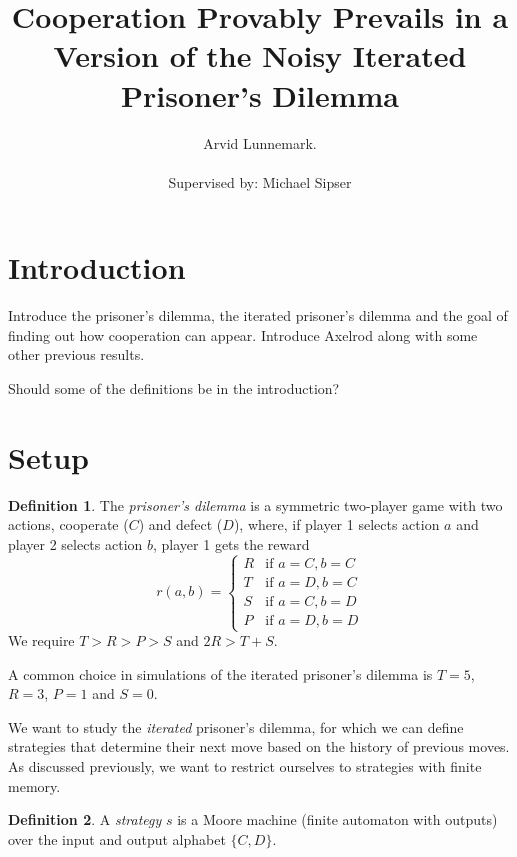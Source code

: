 \documentclass[11pt]{amsart}
\title{Cooperation Provably Prevails in a Version of the Noisy Iterated Prisoner's Dilemma}
\author{Arvid Lunnemark. \\ \\
Supervised by: Michael Sipser}
\theoremstyle{definition}
\newtheorem{definition}{Definition}
\theoremstyle{remark}
\begin{document}
\maketitle

\section{Introduction}

Introduce the prisoner's dilemma, the iterated prisoner's dilemma and the goal of finding out how cooperation can appear. Introduce Axelrod along with some other previous results.

Should some of the definitions be in the introduction?

\section{Setup}

\begin{definition}
  The \textit{prisoner's dilemma} is a symmetric two-player game with two actions, cooperate ($C$) and defect ($D$), where, if player 1 selects action $a$ and player 2 selects action $b$, player 1 gets the reward
  \begin{equation*}
    r(a,b) = \begin{cases}
      R &\text{if $a = C, b = C$} \\
      T &\text{if $a = D, b = C$} \\
      S &\text{if $a = C, b = D$} \\
      P &\text{if $a = D, b = D$}
    \end{cases}
  \end{equation*}
  We require $T > R > P > S$ and $2R > T + S$. 
\end{definition}

A common choice in simulations of the iterated prisoner's dilemma is $T = 5$, $R = 3$, $P = 1$ and $S = 0$.

We want to study the \textit{iterated} prisoner's dilemma, for which we can define strategies that determine their next move based on the history of previous moves. As discussed previously, we want to restrict ourselves to strategies with finite memory.

\begin{definition}
  A \textit{strategy} $s$ is a Moore machine (finite automaton with outputs) over the input and output alphabet $\{C, D\}$. 
\end{definition}
\end{document}

